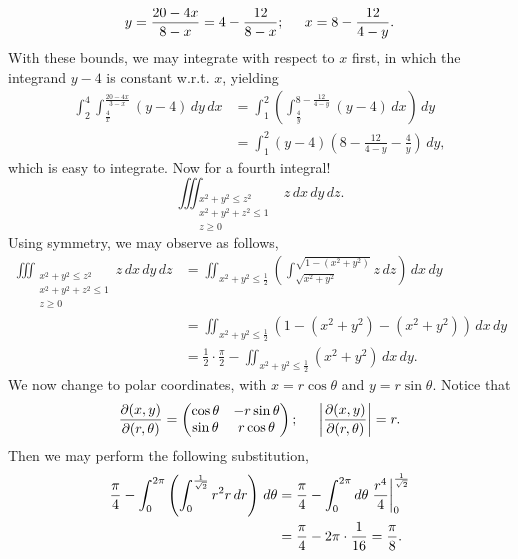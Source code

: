 \[ y = \frac{20 - 4x}{8 - x} = 4 - \frac{12}{8-x}; \hspace{0.2in} x = 8 - \frac{12}{4 - y}. \]
With these bounds, we may integrate with respect to $x$ first, in which the integrand $y - 4$ is constant w.r.t. $x$, yielding
\begin{align*}
    \int_2^4 \int_{\frac{4}{x}}^{\frac{20 - 4x}{3 - x}} (y - 4) \, dy \, dx &= \int_1^2 \left(\int_{\frac{4}{y}}^{8 - \frac{12}{4 - y}} (y - 4) \, dx \right) \, dy \\
    &= \int_1^2 (y - 4)\left(8 - \frac{12}{4 - y} - \frac{4}{y}\right) \, dy,
\end{align*}
which is easy to integrate. Now for a fourth integral!
\[ \iiint_{\substack{x^2 + y^2 \leq z^2 \\ x^2 + y^2 + z^2 \leq 1 \\ z \geq 0}} z \, dx \, dy \, dz. \]
Using symmetry, we may observe as follows,
\begin{align*}
    \iiint_{\substack{x^2 + y^2 \leq z^2 \\ x^2 + y^2 + z^2 \leq 1 \\ z \geq 0}} z \, dx \, dy \, dz &= \iint_{x^2 + y^2 \leq \frac{1}{2}} \left( \int_{\sqrt{x^2 + y^2}}^{\sqrt{1 - (x^2 + y^2)}} z \, dz \right) \, dx \, dy \\
    &= \iint_{x^2 + y^2 \leq \frac{1}{2}} \left(1 - (x^2 + y^2) - (x^2 + y^2) \right) \, dx \, dy \\
    &= \frac{1}{2} \cdot \frac{\pi}{2} - \iint_{x^2 + y^2 \leq \frac{1}{2}} (x^2 + y^2) \, dx \, dy.
\end{align*}
We now change to polar coordinates, with $x = r \cos \theta$ and $y = r \sin \theta$. Notice that
\[ \frac{\partial(x, y)}{\partial(r, \theta)} = \begin{pmatrix} \cos \theta & - r \sin \theta \\ \sin \theta & r \cos \theta \end{pmatrix}; \hspace{0.2in} \left\lvert \frac{\partial(x, y)}{\partial(r, \theta)} \right\rvert = r. \]
Then we may perform the following substitution,
\begin{align*}
    \frac{\pi}{4} - \int_0^{2\pi} \left( \int_0^{\frac{1}{\sqrt{2}}} r^2 r \, dr \right) \, d\theta &= \frac{\pi}{4} - \int_0^{2\pi} d \theta \left.\frac{r^4}{4}\right\rvert_{0}^{\frac{1}{\sqrt{2}}} \\
    &= \frac{\pi}{4} - 2 \pi \cdot \frac{1}{16} = \frac{\pi}{8}.
\end{align*}